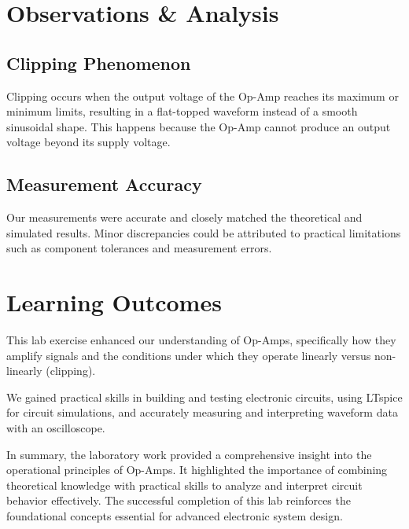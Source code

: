 \section{Observations \& Analysis}

\subsection{Clipping Phenomenon}
Clipping occurs when the output voltage of the Op-Amp reaches its maximum or minimum limits, resulting in a flat-topped waveform instead of a smooth sinusoidal shape. This happens because the Op-Amp cannot produce an output voltage beyond its supply voltage.

\subsection{Measurement Accuracy}
Our measurements were accurate and closely matched the theoretical and simulated results. Minor discrepancies could be attributed to practical limitations such as component tolerances and measurement errors.

\section{Learning Outcomes}

This lab exercise enhanced our understanding of Op-Amps, specifically how they amplify signals and the conditions under which they operate linearly versus non-linearly (clipping).

We gained practical skills in building and testing electronic circuits, using LTspice for circuit simulations, and accurately measuring and interpreting waveform data with an oscilloscope.

In summary, the laboratory work provided a comprehensive insight into the operational principles of Op-Amps. It highlighted the importance of combining theoretical knowledge with practical skills to analyze and interpret circuit behavior effectively. The successful completion of this lab reinforces the foundational concepts essential for advanced electronic system design.
